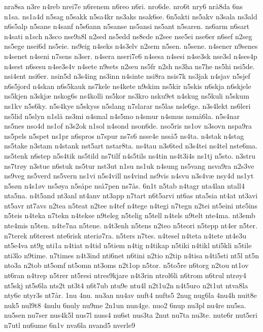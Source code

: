nra8sa
n3re
n4reb
nrei7e
n6renem
n6reo
n6ri.
nro6de.
nro6t
nry6
nr^^e58da
6ns
n1sa.
ns1a4d
n5sag
n5sakk
n5sa4kr
ns3aks
nsak6se.
6n5akti
ns5akv
n3sala
ns3ald
n6s5alp
n5sane
n4sanf
n5s6ann
n5sanse
ns5ansi
ns5ant
n5saren.
ns6arm
n6sart
n4sati
n1sch
n3sco
nse9a8l
n2sed
ns5edd
ns8ede
n2see
nse5ei
nse6er
n6sef
n2seg
ns5ege
nsei6d
ns5eie.
ns9eig
n4seks
n4s3elv
n2sem
n5sen.
n5sene.
n4sener
n9senes
n4senet
n4seni
n7sens
n3ser.
n4sera
nseri7e6
n4sesa
n4sesi
n4se3sk
nse3sl
n4ses4p
n4sest
n6sesu
n4se3s4v
n4sete
n9sets
n2seu
ns5fr
n2sh
ns3ha
ns7he
ns5hi
nsi5de.
nsi4ent
nsi6er.
nsin5d
n3s4ing
ns3inn
n4sinte
nsi8ra
nsis7k
ns3jak
n4sjav
n5sjef
n6s5jord
n4skan
n6s5kauk
ns7kele
ns4kete
n9skim
ns5kir
n5skis
n6skja
n6skjele
ns5kjen
n3skj^^e6
nskog6s
ns4kolli
ns5kor
ns3kro
nsku9et
n4skug
ns5kuli
n5skum
ns1kv
n5s6ky.
n5s4kye
n5skyss
n5slang
n7slarar
ns5las
nsle6ge.
n3s4lekt
ns6leri
ns5lid
n5slyn
n1sl^^e5
ns3mi
n4smal
n4s5mo
n4smur
n4smus
nsm^^e56la.
n5s4nar
ns5nes
nso4d
ns1of
n3s2ok
n1sol
n4sond
nson6de.
nso5ris
ns1ov
n3sovn
nspa9ra
ns5pels
n5spet
ns1pr
n6spros
n7spur
ns7s6
nsse4e
nss^^e55
ns4ta.
n4stak
n4stag
ns5take
n3stam
n4stank
nst5art
nstar8ta.
ns4tau
n3s6ted
n3s4tei
ns4tel
nste6ma.
ns5tenk
n6step
n5s4tik
ns5tild
ns7tilf
n4s5tils
ns4tin
ns4t3i4s
ns1tj
n5sto.
n3stru
ns7tr^^f8y
n3stue
n6stuk
ns5tur
nst3ut
n1su
ns1uk
n4sung
ns5vang
nsva9ra
n2s3ve
ns9veg
ns5verd
ns5vern
ns1vi
n5s4vill
ns4vind
ns9vis
n4svu
n3s4v^^e6
nsy4d
ns1yt
n5s^^f8n
n4s1^^f8v
ns5^^f8ya
n5s^^e5pe
ns^^e57pen
ns7^^e5s.
6n1t
n5tab
n4tagr
nta4lan
ntall4
nta5na.
n4t5and
nt3anl
nt4anv
nt3app
n7tart
n6t5arvi
nt6as
nta5sia
nt4at
nt3avi
nt5avr
nt7avs
n2tea
n5teat
n2tee
n4tef
n4tege
n4tegi
n7tegn
n2tei
nt5eini
nte5ins
n5teis
n4teka
n7tekn
n4tekse
n9teleg
n5telig
n5tell
n4tels
n9telt
nte4ma.
nt3emb
nte4mis
n5ten.
n4te7na
n5tene.
n4t3enh
n5tens
n2teo
n5teori
n5tepp
nt4er
n5ter.
n7terek
n6terest
nte6risk
nteri^^f87ra.
n5ters
n7tes.
n4tesel
n4teta
n4tete
nt4e3u
nt5e4va
nt9g
nti1a
n4tiat
n4tid
n5tiem
n4tig
n4tikap
n5tiki
n4tikl
nti5kli
n5tile
nti3lo
n9time.
n7times
n4t3ind
nti6net
n6tini
n2tio
n2tip
n4tisa
n4ti5sti
nt5l
nt5n
nto3a
n2tob
nt5omf
nt5omn
nt3oms
n2t1op
n5tor.
n5to5re
n6torg
n2tou
nt1ov
nt6ran
n4trep
n5trer
nt5resi
ntres9kjare
n4t3rin
ntrol6li
n6trom
n6trul
ntr^^f8y4
nt5skj
nt5s6la
nts2t
nt3t4
n6t7ub
ntu9e
ntu4l
n2t1u2n
n4t5uro
n2t1ut
ntva8la
nty6e
ntyr3s
nt7^^e5r.
1nu
4nu.
nu3an
nu4av
nuft4
nufts5
2nug
nug6la
4nu4h
nuit8e
nuk5
nul9t8
4nulu
6nuly
nu9me
2n1un
nun4ge.
nuo2
6nup
nu3pl
nu4re
nu5sa.
nu5sen
nu7ser
nus4k5l
nus7l
nuss4
nu6st
nus3ta
2nut
nu7ta
nu3te.
nute6r
nut5eri
n7utl
nu6ume
6n1v
nva6la
nvand5
nverle9

